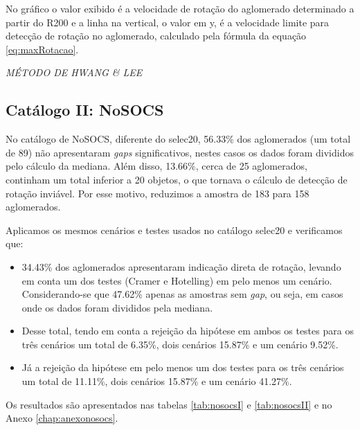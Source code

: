 No gráfico o valor exibido é a velocidade de rotação do aglomerado determinado a partir do R200 e a linha na vertical, o valor em y, é a velocidade limite para detecção de rotação no aglomerado, calculado pela fórmula da equação \ref{eq:maxRotacao}. 

\textit{MÉTODO DE HWANG \& LEE}



\subsection{Catálogo II: NoSOCS}

No catálogo de NoSOCS, diferente do selec20, 56.33\% dos aglomerados (um total de 89) não apresentaram \textit{gaps} significativos, nestes casos os dados foram divididos pelo cálculo da mediana. Além disso, 13.66\%, cerca de 25 aglomerados, continham um total inferior a 20 objetos, o que tornava o cálculo de detecção de rotação inviável. Por esse motivo, reduzimos a amostra de 183 para 158 aglomerados.

Aplicamos os mesmos cenários e testes usados no catálogo selec20 e verificamos que:

\begin{itemize}
   	\item 34.43\% dos aglomerados apresentaram indicação direta de rotação, levando em conta um dos testes (Cramer e Hotelling) em pelo menos um cenário. Considerando-se que 47.62\% apenas as amostras sem \textit{gap}, ou seja, em casos onde os dados foram divididos pela mediana. 
   	\item Desse total, tendo em conta a rejeição da hipótese em ambos os testes para os três cenários um total de 6.35\%, dois cenários 15.87\% e um cenário 9.52\%.
   	\item Já a rejeição da hipótese em pelo menos um dos testes para os três cenários um total de 11.11\%, dois cenários 15.87\% e um cenário 41.27\%. 
 \end{itemize} 

 Os resultados são apresentados nas tabelas \ref{tab:nosocsI} e \ref{tab:nosocsII} e no Anexo \ref{chap:anexonosocs}. 

